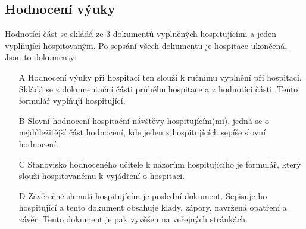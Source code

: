 \subsection{Hodnocení výuky}
Hodnotící část se skládá ze 3 dokumentů vyplněných hospitujícími a jeden vyplňující hospitovaným. Po sepsání všech dokumentu je hospitace ukončená. Jsou to dokumenty:
\begin{itemize}
\item[A] Hodnocení výuky při hospitaci ten slouží k ručnímu vyplnění při hospitaci. Skládá se z dokumentační části průběhu hospitace a z hodnotící části. Tento formulář vyplňují hospitující.
\item[B] Slovní hodnocení hospitační návštěvy hospitujícím(mi), jedná se o nejdůležitější část hodnocení, kde jeden z hospitujících sepíše slovní hodnocení.
\item[C] Stanovisko hodnoceného učitele k názorům hospitujícího je formulář, který slouží hospitovanému k vyjádření o hospitaci.
\item[D] Závěrečné shrnutí hospitujícím je poslední dokument. Sepisuje ho hospitující a tento dokument obsahuje klady, zápory, navržená opatření a závěr. Tento dokument je pak vyvěšen na veřejných stránkách.
\end{itemize}